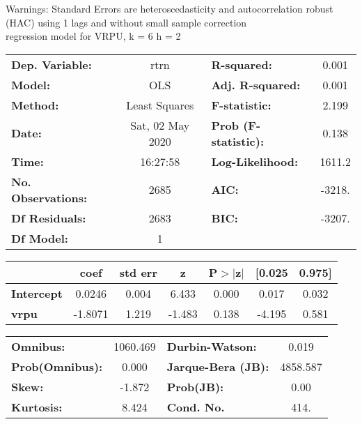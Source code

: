 Warnings: \newline
 [1] Standard Errors are heteroscedasticity and autocorrelation robust (HAC) using 1 lags and without small sample correction\\ 

regression model for VRPU, k = 6 h = 2\begin{center}
\begin{tabular}{lclc}
\toprule
\textbf{Dep. Variable:}    &       rtrn       & \textbf{  R-squared:         } &     0.001   \\
\textbf{Model:}            &       OLS        & \textbf{  Adj. R-squared:    } &     0.001   \\
\textbf{Method:}           &  Least Squares   & \textbf{  F-statistic:       } &     2.199   \\
\textbf{Date:}             & Sat, 02 May 2020 & \textbf{  Prob (F-statistic):} &    0.138    \\
\textbf{Time:}             &     16:27:58     & \textbf{  Log-Likelihood:    } &    1611.2   \\
\textbf{No. Observations:} &        2685      & \textbf{  AIC:               } &    -3218.   \\
\textbf{Df Residuals:}     &        2683      & \textbf{  BIC:               } &    -3207.   \\
\textbf{Df Model:}         &           1      & \textbf{                     } &             \\
\bottomrule
\end{tabular}
\begin{tabular}{lcccccc}
                   & \textbf{coef} & \textbf{std err} & \textbf{z} & \textbf{P$> |$z$|$} & \textbf{[0.025} & \textbf{0.975]}  \\
\midrule
\textbf{Intercept} &       0.0246  &        0.004     &     6.433  &         0.000        &        0.017    &        0.032     \\
\textbf{vrpu}      &      -1.8071  &        1.219     &    -1.483  &         0.138        &       -4.195    &        0.581     \\
\bottomrule
\end{tabular}
\begin{tabular}{lclc}
\textbf{Omnibus:}       & 1060.469 & \textbf{  Durbin-Watson:     } &    0.019  \\
\textbf{Prob(Omnibus):} &   0.000  & \textbf{  Jarque-Bera (JB):  } & 4858.587  \\
\textbf{Skew:}          &  -1.872  & \textbf{  Prob(JB):          } &     0.00  \\
\textbf{Kurtosis:}      &   8.424  & \textbf{  Cond. No.          } &     414.  \\
\bottomrule
\end{tabular}
\end{center}

